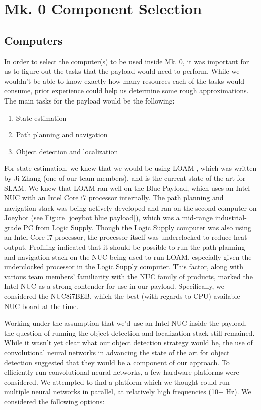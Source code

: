 \section{Mk. 0 Component Selection}

\subsection{Computers}

In order to select the computer(s) to be used inside Mk. 0, it was important for us to figure out the tasks that the payload would need to perform. While we wouldn't be able to know exactly how many resources each of the tasks would consume, prior experience could help us determine some rough approximations. The main tasks for the payload would be the following:

\begin{enumerate}
	\item State estimation
	\item Path planning and navigation
	\item Object detection and localization
\end{enumerate}

For state estimation, we knew that we would be using LOAM \cite{zhang2014loam}, which was written by Ji Zhang (one of our team members), and is the current state of the art for SLAM. We knew that LOAM ran well on the Blue Payload, which uses an Intel NUC with an Intel Core i7 processor internally. The path planning and navigation stack was being actively developed and ran on the second computer on Joeybot (see Figure \ref{joeybot blue payload}), which was a mid-range industrial-grade PC from Logic Supply. Though the Logic Supply computer was also using an Intel Core i7 processor, the processor itself was underclocked to reduce heat output. Profiling indicated that it should be possible to run the path planning and navigation stack on the NUC being used to run LOAM, especially given the underclocked processor in the Logic Supply computer. This factor, along with various team members' familiarity with the NUC family of products, marked the Intel NUC as a strong contender for use in our payload. Specifically, we considered the NUC8i7BEB, which the best (with regards to CPU) available NUC board at the time.

Working under the assumption that we'd use an Intel NUC inside the payload, the question of running the object detection and localization stack still remained. While it wasn't yet clear what our object detection strategy would be, the use of convolutional neural networks in advancing the state of the art for object detection suggested that they would be a component of our approach. To efficiently run convolutional neural networks, a few hardware platforms were considered. We attempted to find a platform which we thought could run multiple neural networks in parallel, at relatively high frequencies (10+ Hz). We considered the following options:

